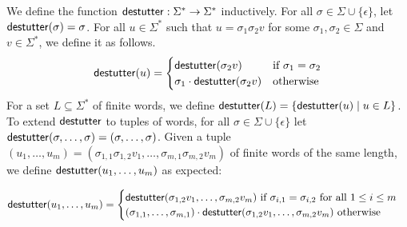 We define the function $\mathsf{destutter} : \Sigma^* \to \Sigma^*$ inductively.
For all $\sigma \in \Sigma \cup \{\epsilon\}$, let $\mathsf{destutter}(\sigma) = \sigma$.
For all $u \in \Sigma^*$ such that $u = \sigma_1 \sigma_2 v$ for some $\sigma_1,\sigma_2 \in 
\Sigma$ and $v \in \Sigma^*$, we define it as follows.
%
\small
\begin{equation*}
	\mathsf{destutter}(u) =
	\begin{cases}
		\mathsf{destutter}(\sigma_2 v) & \text{if } \sigma_1 = \sigma_2 \\
		\sigma_1 \cdot \mathsf{destutter}(\sigma_2 v) & \text{otherwise}
	\end{cases}
\end{equation*}
\normalsize
For a set $L \subseteq \Sigma^*$ of finite words, we define $\destutter(L) = 
\{\destutter(u) \st u \in L\}$.
%
To extend $\mathsf{destutter}$ to tuples of words, for all $\sigma \in \Sigma \cup \{\epsilon\}$  let $\mathsf{destutter}(\sigma, \ldots, \sigma) = (\sigma, \ldots, \sigma)$.
Given a tuple $(u_1, \ldots, u_m) = (\sigma_{1,1} \sigma_{1,2} v_1, \ldots, \sigma_{m,1} \sigma_{m,2} v_m)$ of finite words of the same length, we define $\mathsf{destutter}(u_1, \ldots, u_m)$ as expected:

\small
\begin{equation*}
	\mathsf{destutter}(u_1, \ldots, u_m) =
	\begin{cases}
		\mathsf{destutter}(\sigma_{1,2} v_1, \ldots, \sigma_{m,2} v_m) \text{ if $\sigma_{i,1} = \sigma_{i,2}$ for all $1 \leq i \leq m$} \\
		(\sigma_{1,1}, \ldots, \sigma_{m,1}) \cdot \mathsf{destutter}(\sigma_{1,2} v_1, \ldots, \sigma_{m,2} v_m) \text{ otherwise}
	\end{cases}
\end{equation*}
\normalsize

